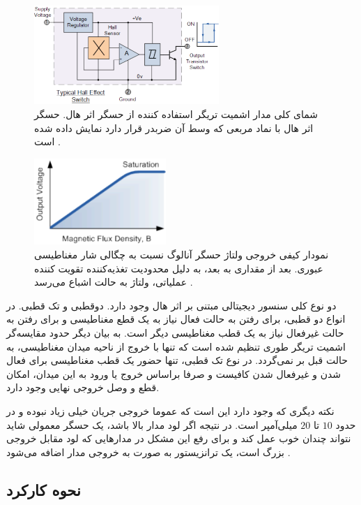 \begin{figure}[t]
	
	\centering 
	\includegraphics[width=70mm]{Images/2.pdf}
	\caption{شمای کلی مدار اشمیت تریگر استفاده کننده از حسگر اثر هال. حسگر اثر هال با نماد مربعی که وسط آن ضربدر قرار دارد نمایش داده شده است 
		\cite{ele_hall_2013}.
	}\label{fig:2}
\end{figure}

\begin{figure}[t]
	
	\centering 
	\includegraphics[width=50mm]{Images/3.pdf}
	\caption{نمودار کیفی خروجی ولتاژ حسگر آنالوگ نسبت به چگالی شار مغناطیسی عبوری. بعد از مقداری به بعد، به دلیل محدودیت تغذیه‌کننده تقویت کننده عملیاتی، ولتاژ به حالت اشباع می‌رسد
		\cite{ele_hall_2013}.
	}\label{fig:3}
\end{figure}


دو نوع کلی سنسور دیجیتالی مبتنی بر اثر هال وجود دارد. دوقطبی و تک قطبی. در انواع دو قطبی، برای رفتن به حالت فعال نیاز به یک قطع مغناطیسی و برای رفتن به حالت غیرفعال نیاز به یک قطب مغناطیسی دیگر است. به بیان دیگر حدود مقایسه‌گر اشمیت‌ تریگر طوری تنظیم شده است که تنها با خروج از ناحیه میدان مغناطیسی، به حالت قبل بر نمی‌گردد. در نوع تک قطبی، تنها حضور یک قطب مغناطیسی برای فعال شدن و غیرفعال شدن کافیست و صرفا براساس خروج یا ورود به این میدان، امکان قطع و وصل خروجی نهایی وجود دارد.

نکته دیگری که وجود دارد این است که عموما خروجی جریان خیلی زیاد نبوده و در حدود $10$ تا $20$ میلی‌آمپر است. در نتیجه اگر لود مدار بالا باشد، یک حسگر معمولی شاید نتواند چندان خوب عمل کند و برای رفع این مشکل در مدار‌هایی که لود مقابل خروجی بزرگ است، یک ترانزیستور  به صورت  به خروجی مدار اضافه می‌شود 	\cite{ele_hall_2013}.


\subsection{نحوه کارکرد}

